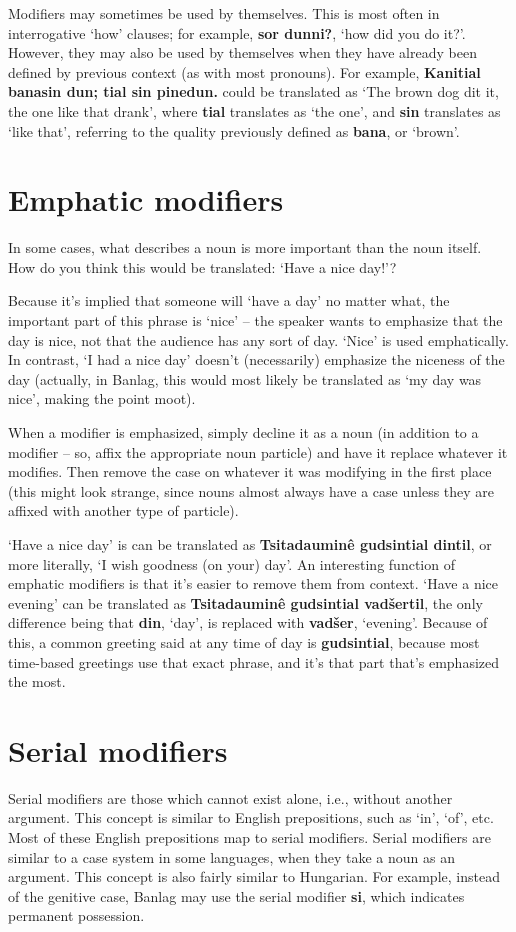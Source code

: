 \documentclass[12pt]{report}
\begin{document}
Modifiers may sometimes be used by themselves. This is most often in interrogative `how' clauses; for example, \textbf{sor dunni?}, `how did you do it?'. However, they may also be used by themselves when they have already been defined by previous context (as with most pronouns). For example, \textbf{Kanitial banasin dun; tial sin pinedun.} could be translated as `The brown dog dit it, the one like that drank', where \textbf{tial} translates as `the one', and \textbf{sin} translates as `like that', referring to the quality previously defined as \textbf{bana}, or `brown'.

\section{Emphatic modifiers}
In some cases, what describes a noun is more important than the noun itself. How do you think this would be translated: `Have a nice day!'?

Because it's implied that someone will `have a day' no matter what, the important part of this phrase is `nice' -- the speaker wants to emphasize that the day is nice, not that the audience has any sort of day. `Nice' is used emphatically. In contrast, `I had a nice day' doesn't (necessarily) emphasize the niceness of the day (actually, in Banlag, this would most likely be translated as `my day was nice', making the point moot).

When a modifier is emphasized, simply decline it as a noun (in addition to a modifier -- so, affix the appropriate noun particle) and have it replace whatever it modifies. Then remove the case on whatever it was modifying in the first place (this might look strange, since nouns almost always have a case unless they are affixed with another type of particle).

`Have a nice day' is can be translated as \textbf{Tsitadaumin\^e gudsintial dintil}, or more literally, `I wish goodness (on your) day'. An interesting function of emphatic modifiers is that it's easier to remove them from context. `Have a nice evening' can be translated as \textbf{Tsitadaumin\^e gudsintial vad\v sertil}, the only difference being that \textbf{din}, `day', is replaced with \textbf{vad\v ser}, `evening'. Because of this, a common greeting said at any time of day is \textbf{gudsintial}, because most time-based greetings use that exact phrase, and it's that part that's emphasized the most.

\section{Serial modifiers}
Serial modifiers are those which cannot exist alone, i.e., without another argument. This concept is similar to English prepositions, such as `in', `of', etc. Most of these English prepositions map to serial modifiers. Serial modifiers are similar to a case system in some languages, when they take a noun as an argument. This concept is also fairly similar to Hungarian. For example, instead of the genitive case, Banlag may use the serial modifier \textbf{si}, which indicates permanent possession. 
\end{document}

